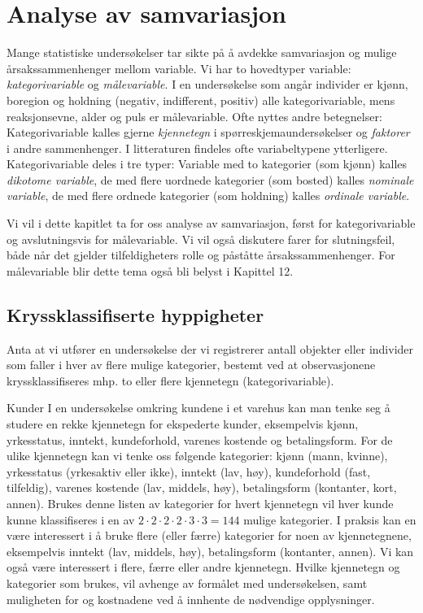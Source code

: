 \chapter{Analyse av samvariasjon}
\label{kap:samvariasjon} %

Mange statistiske undersøkelser tar sikte på å avdekke
samvariasjon og mulige årsakssammenhenger mellom variable.
Vi har to hovedtyper variable: {\em kategorivariable} og 
{\em målevariable}. I en undersøkelse som angår individer er
kjønn, boregion og holdning (negativ, indifferent, positiv) alle
kategorivariable, mens reaksjonsevne, alder og puls er målevariable.
Ofte nyttes andre betegnelser: Kategorivariable kalles gjerne {\em kjennetegn}
i spørre\-skjema\-under\-søkelser og {\em faktorer} i andre sammenhenger.
I litteraturen findeles ofte variabeltypene ytterligere.
Kategorivariable deles i tre typer: Variable med to kategorier (som kjønn)
kalles {\em dikotome variable}, de med flere uordnede kategorier (som bosted)
kalles {\em nominale variable}, de med flere ordnede kate\-gorier (som holdning)
kalles {\em ordinale variable}.

Vi vil i dette kapitlet ta for oss analyse av samvariasjon, først
for kategorivariable og avslutningsvis for målevariable.
Vi vil også diskutere farer for slutningsfeil, både når det gjelder
tilfeldigheters rolle og påståtte årsakssammenhenger.
For målevariable blir dette tema også bli belyst i Kapittel 12.

\section{Kryssklassifiserte hyppigheter}
Anta at vi utfører en  undersøkelse der vi registrerer antall objekter
eller individer som faller i hver av flere mulige kategorier, bestemt
ved at observasjonene kryssklassifiseres mhp. to eller flere kjennetegn
(kategorivariable).\\

\begin{eksempel}{Kunder}
I en undersøkelse omkring kundene i et varehus kan man tenke seg å
studere en rekke kjennetegn for ekspederte kunder, eksempelvis kjønn,
yrkesstatus, inntekt, kundeforhold, varenes kostende og betalingsform.
For de ulike kjennetegn kan vi tenke oss følgende kategorier:  kjønn
(mann, kvinne), yrkesstatus (yrkesaktiv eller ikke), inntekt (lav, høy),
kundeforhold (fast, tilfeldig), varenes kostende (lav, middels, høy),
betalingsform (kontanter, kort, annen).  Brukes denne listen av
kategorier for hvert kjennetegn vil hver kunde kunne klassifiseres i en
av $2\cdot 2\cdot 2\cdot 2\cdot 3\cdot 3 = 144$ mulige kategorier.
I praksis kan en være interessert i å bruke flere (eller færre)
kategorier for noen av kjennetegnene, eksempelvis inntekt (lav, middels,
høy), betalingsform (kontanter, annen).  Vi kan også være
interessert i flere, færre eller andre kjennetegn.  Hvilke kjennetegn
og kategorier som brukes, vil avhenge av formålet med undersøkelsen,
samt muligheten for og kostnadene ved å innhente de nødvendige
opplysninger.
\end{eksempel}

